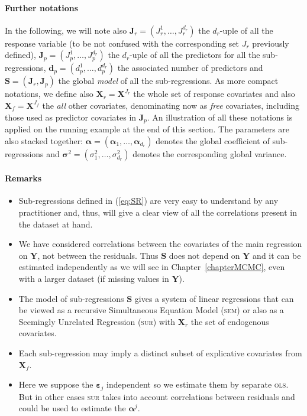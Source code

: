 \documentclass[12pt,a4paper]{report}
\begin{document}
\paragraph{Further notations} In the following, we will note also $\boldsymbol{J}_r=(J_{r}^1,\ldots,J_r^{d_r})$ the $d_r$-uple of all the response variable (to be not confused with the corresponding set $J_r$ previously defined), $\boldsymbol{J}_p=(J_{p}^1,\ldots,J_p^{d_r})$ the $d_r$-uple of all the predictors for all the sub-regressions, $\boldsymbol{d}_p=(d_p^1,\ldots,d_p^{d_{r}})$ the associated number of predictors and $\boldsymbol{S}=(\boldsymbol{J}_r,\boldsymbol{J}_p)$ the global {\it model} of all the sub-regressions. As more compact notations, we define also $\boldsymbol{X}_r=\boldsymbol{X}^{J_{r}}$ the whole set of response covariates and also $\boldsymbol{X}_f=\boldsymbol{X}^{J_{f}}$ the {\it all} other covariates, denominating now as {\it free} covariates, including those used as predictor covariates in $\boldsymbol{J}_p$. An illustration of all these notations is applied on the running example at the end of this section. The parameters are also stacked together: $\boldsymbol{\alpha}=(\boldsymbol{\alpha}_1,\ldots,\boldsymbol{\alpha}_{d_r})$ denotes the global coefficient of sub-regressions and $\boldsymbol{\sigma}^2=(\sigma^2_1,\ldots,\sigma^2_{d_r})$ denotes the corresponding global variance.

\paragraph{Remarks}
\begin{itemize}
\item Sub-regressions defined in (\ref{eq:SR}) are very easy to understand by any practitioner and, thus, will give a clear view of all the correlations present in the dataset at hand.
\item We have considered correlations between the covariates of the main regression on $\boldsymbol{Y}$, not between the residuals. Thus $\boldsymbol{S}$ does not depend on $\boldsymbol{Y}$ and it can be estimated independently as we will see in Chapter~\ref{chapterMCMC}, even with a larger dataset (if missing values in $\boldsymbol{Y}$).
\item The model of sub-regressions $\boldsymbol{S}$ gives a system of linear regressions that can be viewed as a recursive Simultaneous Equation Model (\textsc{sem})\cite{davidson1993estimation,TIMM} or also as a Seemingly Unrelated Regression (\textsc{sur}) \cite{SURzellner} with $\boldsymbol{X}_r$ the set of endogenous covariates.
\item Each sub-regression may imply a distinct subset of explicative covariates from $\boldsymbol{X}_f$.
\item Here we suppose the $\boldsymbol{\varepsilon}_j$ independent so we estimate them by separate \textsc{ols}. But in other cases \textsc{sur} takes into account correlations between residuals and could be used to estimate the $\boldsymbol{\alpha}^j$. 
\end{itemize} 
\end{document}
